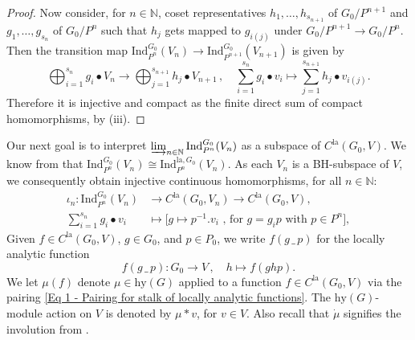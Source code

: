 \documentclass[a4paper, reqno, 10pt]{amsart}
\theoremstyle{definition}
\numberwithin{equation}{section}
\newcommand{\blank}{{\,\_\,}}
\newcommand{\hy}{{\mathrm{hy}}}
\newcommand{\Ind}{{\mathrm{Ind}}}
\newcommand{\la}{{\mathrm{la}}}
\newcommand{\lra}{\longrightarrow}
\newcommand{\lto}{\longmapsto}
\newcommand{\mto}{\mapsto}
\newcommand{\ra}{\rightarrow}
\newcommand{\BN}{{\mathbb {N}}}
\begin{document}
\begin{proof}
	Now consider, for $n\in \BN$, coset representatives $h_1,\ldots,h_{s_{n+1}}$ of $G_0/P^{n+1}$ and $g_1,\ldots,g_{s_n}$ of $G_0/P^n$ such that $h_j$ gets mapped to $g_{i(j)}$ under $G_0/P^{n+1}\ra G_0/P^n$.
	Then the transition map $\Ind^{G_0}_{P^n} (V_n) \ra \Ind^{G_0}_{P^{n+1}} (V_{n+1})$ is given by
	\begin{equation*}
		\bigoplus_{i=1}^{s_n} g_i \bullet V_n \lra \bigoplus_{j=1}^{s_{n+1}} h_j \bullet V_{n+1} \,,\quad  \sum_{i=1}^{s_n} g_i \bullet v_i \lto \sum_{j=1}^{s_{n+1}} h_j \bullet v_{i(j)} .
	\end{equation*}
	Therefore it is injective and compact as the finite direct sum of compact homomorphisms, by  (iii).
\end{proof}



Our next goal is to interpret $\varinjlim_{n\in \BN} \Ind^{G_0}_{P^n} (V_n)$ as a subspace of $C^\la (G_0,V)$.
We know from  that $\Ind^{G_0}_{P^n} (V_n) \cong \Ind^{\la,G_0}_{P^n} (V_n)$.
As each $V_n$ is a BH-subspace of $V$, we consequently obtain injective continuous homomorphisms, for all $n\in\BN$:
\begin{align*}
	\iota_n \colon	\Ind^{G_0}_{P^n} (V_n) &\lra C^\la (G_0,V_n) \lra C^\la (G_0,V) , \\
	\sum_{i=1}^{s_n} g_i \bullet v_i &\lto \big[ g \mto p^{-1}.v_i \text{ , for $g = g_i p$ with $p\in P^n$} \big] ,
\end{align*}
Given $f\in C^\la(G_0,V)$, $g\in G_0$, and $p\in P_0$, we write $f(g\blank p)$ for the locally analytic function
\begin{equation*}
	f(g\blank p) \colon G_0 \lra V \,,\quad h \lto f(g h p) .
\end{equation*}
We let $\mu (f)$ denote $\mu \in \hy(G)$ applied to a function $f\in C^\la (G_0,V)$ via the pairing \eqref{Eq 1 - Pairing for stalk of locally analytic functions}.
The $\hy(G)$-module action on $V$ is denoted by $\mu \ast v$, for $v\in V$.
Also recall that $\dot{\mu}$ signifies the involution from .
\end{document}
